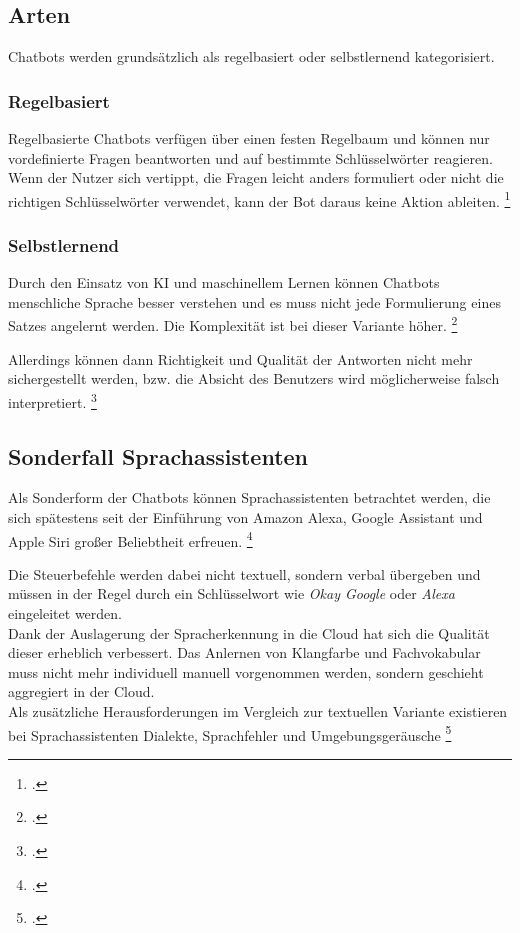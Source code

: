 \subsection{Arten}
Chatbots werden grundsätzlich als regelbasiert oder selbstlernend kategorisiert.
\subsubsection{Regelbasiert}
Regelbasierte Chatbots verfügen über einen festen Regelbaum und können nur vordefinierte Fragen beantworten und auf bestimmte Schlüsselwörter reagieren.\\
Wenn der Nutzer sich vertippt, die Fragen leicht anders formuliert oder nicht die richtigen Schlüsselwörter verwendet, kann der Bot daraus keine Aktion ableiten.
\footcite[Vgl.][51\psq]{Groetz_2018_Sprich_mit_mir}
\subsubsection{Selbstlernend}
Durch den Einsatz von \acs{KI} und maschinellem Lernen können Chatbots menschliche Sprache besser verstehen und es muss nicht jede Formulierung eines Satzes angelernt werden. Die Komplexität ist bei dieser Variante höher.
\footcite[Vgl.][51\psq]{Groetz_2018_Sprich_mit_mir}

Allerdings können dann Richtigkeit und Qualität der Antworten nicht mehr sichergestellt werden, bzw. die Absicht des Benutzers wird möglicherweise falsch interpretiert.
\footcite[Vgl.][151\psq]{Feindt_2006_Gespraechskompetenz}

\subsection{Sonderfall Sprachassistenten}
Als Sonderform der Chatbots können Sprachassistenten betrachtet werden, die sich spätestens seit der Einführung von Amazon Alexa, Google Assistant und Apple Siri großer Beliebtheit erfreuen.
\footcite[Vgl.][50]{Groetz_2018_Sprich_mit_mir}

Die Steuerbefehle werden dabei nicht textuell, sondern verbal übergeben und müssen in der Regel durch ein Schlüsselwort wie \textit{Okay Google} oder \textit{Alexa} eingeleitet werden.\\
Dank der Auslagerung der Spracherkennung in die Cloud hat sich die Qualität dieser erheblich verbessert. Das Anlernen von Klangfarbe und Fachvokabular muss nicht mehr individuell manuell vorgenommen werden, sondern geschieht aggregiert in der Cloud.\\
Als zusätzliche Herausforderungen im Vergleich zur textuellen Variante existieren bei Sprachassistenten \glqq{}Dialekte, Sprachfehler und Umgebungsgeräusche\grqq
\footcites[][64]{Puscher_2018_Gut_zugehoert}[Vgl.][64]{Puscher_2018_Gut_zugehoert}

